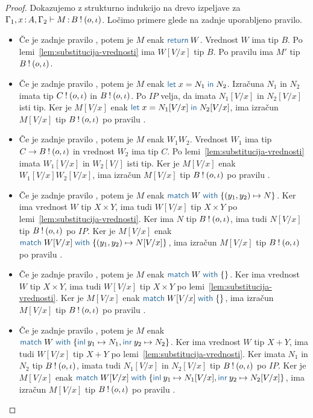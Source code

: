\begin{proof}
	Dokazujemo z strukturno indukcijo na drevo izpeljave za $\Gamma_1, x \mathinner{:} A, \Gamma_2 \vdash M \mathinner{:} B \mathbin{!} (o, \iota)$.
	Ločimo primere glede na zadnje uporabljeno pravilo.
	
	\begin{itemize}
		\item Če je zadnje pravilo , potem je $M$ enak $\tmreturn{W}$.
		Vrednost $W$ ima tip $B$.
		Po lemi~\ref{lem:substitucija-vrednosti} ima $W[V/x]$ tip $B$.
		Po pravilu  ima $M'$ tip $B \mathbin{!} (o, \iota)$.
		
		\item Če je zadnje pravilo , potem je $M$ enak $\tmlet{x}{N_1}{N_2}$.
		Izračuna $N_1$ in $N_2$ imata tip $C \mathbin{!} (o, \iota)$ in $B \mathbin{!} (o, \iota)$.
		Po $IP$ velja, da imata $N_1[V/x]$ in $N_2[V/x]$ isti tip.
		Ker je $M[V/x]$ enak $\tmlet{x}{N_1[V/x]}{N_2[V/x]}$, ima izračun $M[V/x]$ tip $B \mathbin{!} (o, \iota)$ po pravilu .
		
		\item Če je zadnje pravilo , potem je $M$ enak $W_1 W_2$. Vrednost $W_1$ ima tip $C \to B \mathbin{!} (o, \iota)$ in vrednost $W_2$ ima tip $C$.
		Po lemi~\ref{lem:substitucija-vrednosti} imata $W_1[V/x]$ in $W_2[V/]$ isti tip.
		Ker je $M[V/x]$ enak $W_1[V/x] W_2[V/x]$, ima izračun $M[V/x]$ tip $B \mathbin{!} (o, \iota)$ po pravilu .
		
		\item Če je zadnje pravilo , potem je $M$ enak $\tmmatch{W}{(y_1,y_2) \mapsto N}$. 
		Ker ima vrednost $W$ tip $X \times Y$, ima tudi $W[V/x]$ tip $X \times Y$ po lemi~\ref{lem:substitucija-vrednosti}.
		Ker ima $N$ tip $B \mathbin{!} (o, \iota)$, ima tudi $N[V/x]$ tip $B \mathbin{!} (o, \iota)$ po $IP$.
		Ker je $M[V/x]$ enak $\tmmatch{W[V/x]}{(y_1,y_2) \mapsto N[V/x]}$, ima izračun $M[V/x]$ tip $B \mathbin{!} (o, \iota)$ po pravilu . 
		
		\item Če je zadnje pravilo , potem je $M$ enak $\tmmatch{W}{}$.
		Ker ima vrednost $W$ tip $X \times Y$, ima tudi $W[V/x]$ tip $X \times Y$ po lemi~\ref{lem:substitucija-vrednosti}.
		Ker je $M[V/x]$ enak $\tmmatch{W[V/x]}{}$, ima izračun $M[V/x]$ tip $B \mathbin{!} (o, \iota)$ po pravilu .
		
		\item Če je zadnje pravilo , potem je $M$ enak $\tmmatch{W}{\tminl{y_1} \mapsto N_1, \tminr{y_2} \mapsto N_2}$.
		Ker ima vrednost $W$ tip $X + Y$, ima tudi $W[V/x]$ tip $X + Y$ po lemi~\ref{lem:substitucija-vrednosti}.
		Ker imata $N_1$ in $N_2$ tip $B \mathbin{!} (o, \iota)$, imata tudi $N_1[V/x]$ in $N_2[V/x]$ tip $B \mathbin{!} (o, \iota)$ po $IP$.
		Ker je $M[V/x]$ enak $\tmmatch{W[V/x]}{\tminl{y_1} \mapsto N_1[V/x], \tminr{y_2} \mapsto N_2[V/x]}$, ima izračun $M[V/x]$ tip $B \mathbin{!} (o, \iota)$ po pravilu .
		

\end{itemize}
\end{proof}
